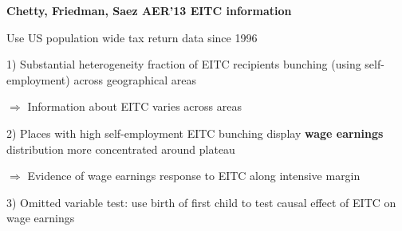 \documentclass[landscape]{slides}
\begin{document}
\begin{slide}%
\begin{center}
{\bf Chetty, Friedman, Saez AER'13 EITC information}
\end{center}
Use US population wide tax return data since 1996

1) Substantial heterogeneity fraction of EITC recipients bunching (using self-employment)
across geographical
areas 

$\Rightarrow$ Information about EITC varies across areas

2) Places with high self-employment EITC bunching display
{\bf wage earnings} distribution more concentrated around plateau

$\Rightarrow$ Evidence of wage earnings response to EITC along intensive
margin

3) Omitted variable test: use birth of first child to test
causal effect of EITC on wage earnings

\end{slide}

\begin{slide}

\end{slide}


%
%
%
%
%
%
%
\end{document}
